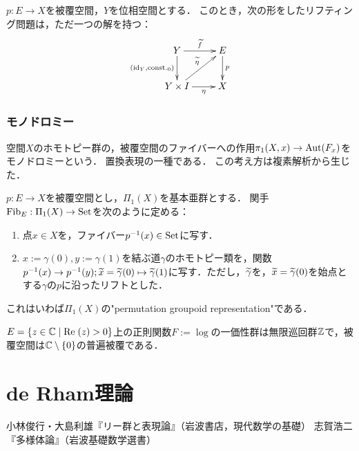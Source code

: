 \documentclass[uplatex,dvipdfmx]{jsreport}
\begin{document}
\begin{proposition}
    $p:E\to X$を被覆空間，$Y$を位相空間とする．
    このとき，次の形をしたリフティング問題は，ただ一つの解を持つ：
    \[\xymatrix{
        Y\ar[r]^-{\wt{f}}\ar[d]_-{(\id_Y,\const_0)}&E\ar[d]^-p\\
        Y\times I\ar[r]_-{\eta}\ar[ur]^-{\wt{\eta}}&X
    }\]
\end{proposition}

\subsection{モノドロミー}

\begin{tcolorbox}[colframe=ForestGreen, colback=ForestGreen!10!white,breakable,colbacktitle=ForestGreen!40!white,coltitle=black,fonttitle=\bfseries\sffamily,
title=]
    空間$X$のホモトピー群の，被覆空間のファイバーへの作用$\pi_1(X,x)\to\mathrm{Aut}(F_x)$をモノドロミーという．
    置換表現の一種である．
    この考え方は複素解析から生じた．
\end{tcolorbox}

\begin{definition}
    $p:E\to X$を被覆空間とし，$\Pi_1(X)$を基本亜群とする．
    関手$\mathrm{Fib}_E:\Pi_1(X)\to\mathrm{Set}$を次のように定める：
    \begin{enumerate}
        \item 点$x\in X$を，ファイバー$p^{-1}(x)\in\mathrm{Set}$に写す．
        \item $x:=\gamma(0),y:=\gamma(1)$を結ぶ道$\gamma$のホモトピー類を，関数$p^{-1}(x)\to p^{-1}(y);\widetilde{x}=\widetilde{\gamma}(0)\mapsto \widetilde{\gamma}(1)$に写す．ただし，$\widetilde{\gamma}$を，$\widetilde{x}=\widetilde{\gamma}(0)$を始点とする$\gamma$の$p$に沿ったリフトとした．
    \end{enumerate}
\end{definition}
\begin{remarks}
    これはいわば$\Pi_1(X)$の"permutation groupoid representation"である．
\end{remarks}

\begin{example}
    $E=\left\{z\in\mathbb{C}\mid\mathrm{Re}\;(z)>0\right\}$上の正則関数$F:=\log$の一価性群は無限巡回群$\mathbb{Z}$で，被覆空間は$\mathbb{C}\setminus\{0\}$の普遍被覆である．
\end{example}

\chapter{de Rham理論}

\begin{thebibliography}{9}
    小林俊行・大島利雄『リー群と表現論』（岩波書店，現代数学の基礎）
    志賀浩二『多様体論』（岩波基礎数学選書）
\end{thebibliography}
\end{document}
